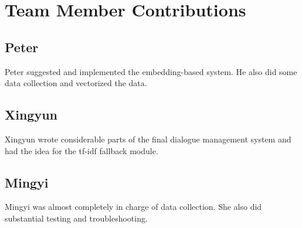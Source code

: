 \documentclass[11pt]{article}
\begin{document}
\section{Team Member Contributions}

\subsection{Peter}

Peter suggested and implemented the embedding-based system. He also did some data collection and vectorized the data.

\subsection{Xingyun}

Xingyun wrote considerable parts of the final dialogue management system and had the idea for the tf-idf fallback module.

\subsection{Mingyi}

Mingyi was almost completely in charge of data collection. She also did substantial testing and troubleshooting.


%
%

\end{document}
